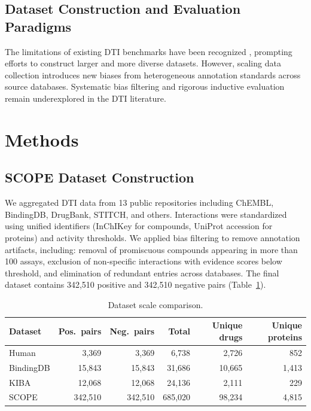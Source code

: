 \documentclass[11pt]{article}
\begin{document}
\subsection{Dataset Construction and Evaluation Paradigms}

The limitations of existing DTI benchmarks have been recognized \citep{yang2019}, prompting efforts to construct larger and more diverse datasets. However, scaling data collection introduces new biases from heterogeneous annotation standards across source databases. Systematic bias filtering and rigorous inductive evaluation remain underexplored in the DTI literature.

\section{Methods}

\subsection{SCOPE Dataset Construction}

We aggregated DTI data from 13 public repositories including ChEMBL, BindingDB, DrugBank, STITCH, and others. Interactions were standardized using unified identifiers (InChIKey for compounds, UniProt accession for proteins) and activity thresholds. We applied bias filtering to remove annotation artifacts, including: removal of promiscuous compounds appearing in more than 100 assays, exclusion of non-specific interactions with evidence scores below threshold, and elimination of redundant entries across databases. The final dataset contains 342,510 positive and 342,510 negative pairs (Table~\ref{tab:datasets}).

\begin{table}[h]
\centering
\caption{Dataset scale comparison.}
\label{tab:datasets}
\begin{tabular}{lrrrrr}
\toprule
Dataset & Pos.\ pairs & Neg.\ pairs & Total & Unique drugs & Unique proteins \\
\midrule
Human & 3,369 & 3,369 & 6,738 & 2,726 & 852 \\
BindingDB & 15,843 & 15,843 & 31,686 & 10,665 & 1,413 \\
KIBA & 12,068 & 12,068 & 24,136 & 2,111 & 229 \\
SCOPE & 342,510 & 342,510 & 685,020 & 98,234 & 4,815 \\
\bottomrule
\end{tabular}
\end{table}
\end{document}
